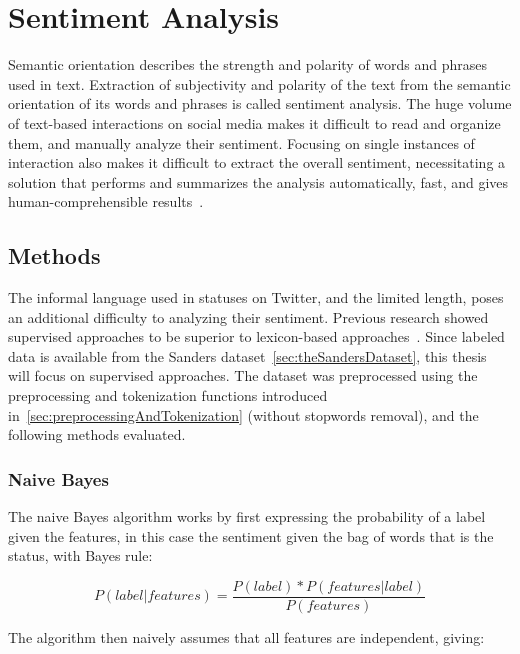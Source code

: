 \chapter{Sentiment Analysis}
\label{ch:sentimentAnalysis}

Semantic orientation describes the strength and polarity of words and phrases used in text.
Extraction of subjectivity and polarity of the text from the semantic orientation of its words and phrases is called sentiment analysis.
The huge volume of text-based interactions on social media makes it difficult
to read and organize them, and manually analyze their sentiment.
Focusing on single instances of interaction also makes it difficult to extract the overall sentiment,
necessitating a solution that performs and summarizes the analysis automatically, fast, and gives human-comprehensible results~\cite{Sarlan2014}.

\section{Methods}
\label{sec:methods_sa}

The informal language used in statuses on Twitter, and the limited length, poses an additional difficulty
to analyzing their sentiment.
Previous research showed supervised approaches to be superior to lexicon-based approaches~\cite{Sarlan2014}.
Since labeled data is available from the Sanders dataset~\cref{sec:theSandersDataset},
this thesis will focus on supervised approaches.
The dataset was preprocessed using the preprocessing and tokenization functions introduced in~\cref{sec:preprocessingAndTokenization} (without stopwords removal),
and the following methods evaluated.

\subsection{Naive Bayes}
\label{subsec:naivebayes}

The naive Bayes algorithm works by first expressing the probability of a label given the features,
in this case the sentiment given the bag of words that is the status, with Bayes rule:

\begin{equation}
    P(label|features) = \frac{P(label)*P(features|label)}{P(features)}
\end{equation}

The algorithm then naively assumes that all features are independent, giving:

